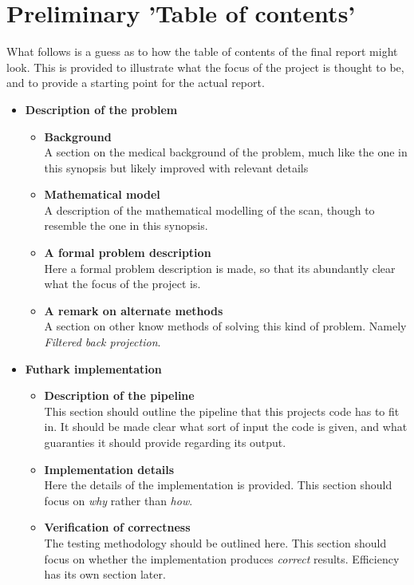\section{Preliminary 'Table of contents'}
What follows is a guess as to how the table of contents of the final report might look. This is provided to illustrate what the focus of the project is thought to be, and to provide a starting point for the actual report.
\begin{itemize}
  \item \textbf{Description of the problem}
  \begin{itemize}
    \item \textbf{Background}\\A section on the medical background of the problem, much like the one in this synopsis but likely improved with relevant details
    \item \textbf{Mathematical model}\\A description of the mathematical modelling of the scan, though to resemble the one in this synopsis.
    \item \textbf{A formal problem description}\\Here a formal problem description is made, so that its abundantly clear what the focus of the project is.
    \item \textbf{A remark on alternate methods}\\A section on other know methods of solving this kind of problem. Namely \emph{Filtered back projection}.
  \end{itemize}
  \item \textbf{Futhark implementation}
  \begin{itemize}
    \item \textbf{Description of the pipeline}\\This section should outline the pipeline that this projects code has to fit in. It should be made clear what sort of input the code is given, and what guaranties it should provide regarding its output.
    \item \textbf{Implementation details}\\Here the details of the implementation is provided. This section should focus on \emph{why} rather than \emph{how}.
    \item \textbf{Verification of correctness}\\The testing methodology should be outlined here. This section should focus on whether the implementation produces \emph{correct} results. Efficiency has its own section later.

\end{itemize}
\end{itemize}
